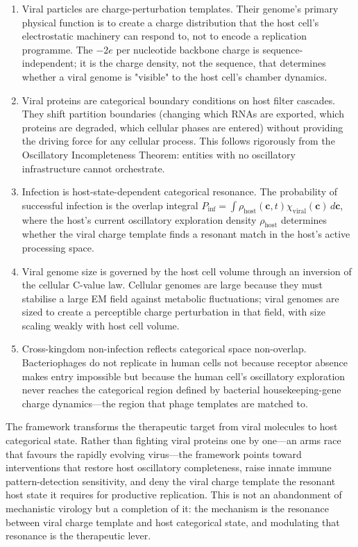 \documentclass[12pt,a4paper]{article}
\theoremstyle{definition}
\theoremstyle{remark}
\newcommand{\Phost}{\rho_{\mathrm{host}}}
\newcommand{\chiviral}{\chi_{\mathrm{viral}}}
\newcommand{\vv}[1]{\boldsymbol{#1}}
\begin{document}
\begin{enumerate}[(1)]
  \item Viral particles are charge-perturbation templates. Their genome's primary physical function is to create a charge distribution that the host cell's electrostatic machinery can respond to, not to encode a replication programme. The $-2e$ per nucleotide backbone charge is sequence-independent; it is the charge density, not the sequence, that determines whether a viral genome is "visible" to the host cell's chamber dynamics.

  \item Viral proteins are categorical boundary conditions on host filter cascades. They shift partition boundaries (changing which RNAs are exported, which proteins are degraded, which cellular phases are entered) without providing the driving force for any cellular process. This follows rigorously from the Oscillatory Incompleteness Theorem: entities with no oscillatory infrastructure cannot orchestrate.

  \item Infection is host-state-dependent categorical resonance. The probability of successful infection is the overlap integral $P_{\mathrm{inf}} = \int \Phost(\vv{c},t) \chiviral(\vv{c})\,d\vv{c}$, where the host's current oscillatory exploration density $\Phost$ determines whether the viral charge template finds a resonant match in the host's active processing space.

  \item Viral genome size is governed by the host cell volume through an inversion of the cellular C-value law. Cellular genomes are large because they must stabilise a large EM field against metabolic fluctuations; viral genomes are sized to create a perceptible charge perturbation in that field, with size scaling weakly with host cell volume.

  \item Cross-kingdom non-infection reflects categorical space non-overlap. Bacteriophages do not replicate in human cells not because receptor absence makes entry impossible but because the human cell's oscillatory exploration never reaches the categorical region defined by bacterial housekeeping-gene charge dynamics---the region that phage templates are matched to.
\end{enumerate}

The framework transforms the therapeutic target from viral molecules to host categorical state. Rather than fighting viral proteins one by one---an arms race that favours the rapidly evolving virus---the framework points toward interventions that restore host oscillatory completeness, raise innate immune pattern-detection sensitivity, and deny the viral charge template the resonant host state it requires for productive replication. This is not an abandonment of mechanistic virology but a completion of it: the mechanism is the resonance between viral charge template and host categorical state, and modulating that resonance is the therapeutic lever.



\end{document}
